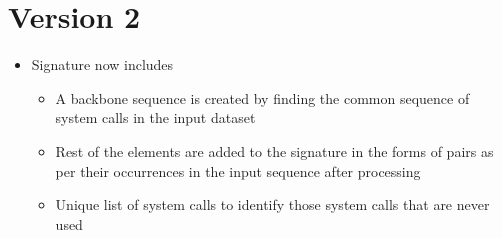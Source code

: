 \section{Version 2}
\begin{itemize}
    \item[] {Signature now includes}
        \begin{itemize}
            \item A backbone sequence is created by finding the common sequence of system calls in the input dataset
            \item Rest of the elements are added to the signature in the forms of pairs as per their occurrences in the input sequence after processing
            \item Unique list of system calls to identify those system calls that are never used
        \end{itemize}
\end{itemize}
